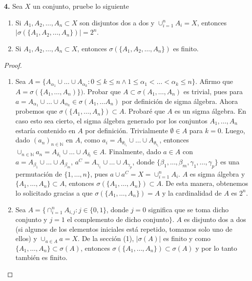 \documentclass{article}
\newenvironment{statement}[1]{\smallskip\noindent\color[rgb]{1.00,0.00,0.50} {\bf #1.}}{}
\theoremstyle{definition}
\theoremstyle{remark}
\newcommand{\BN}{\mathbb N}
\begin{document}
\begin{statement}{4}
  Sea $X$ un conjunto, pruebe lo siguiente
  \begin{enumerate}
    \item Si $A_1, A_2, \dots, A_n \subset X$ son disjuntos dos a dos y $\cup_{i = 1}^n A_i = X$, entonces $|\sigma(\{A_1, A_2, \dots, A_n\})| = 2^n$.
    \item Si $A_1, A_2, \dots, A_n \subset X$, entonces $\sigma(\{A_1, A_2, \dots, A_n\})$ es finito.
  \end{enumerate}
\end{statement}

\begin{proof}
  \begin{enumerate}
    \item Sea $A = \{A_{\alpha_1} \cup \dots \cup A_{\alpha_k} : 0 \leq k \leq n \land 1 \leq \alpha_1 < \dots < \alpha_k \leq n\}$. Afirmo que $A = \sigma(\{A_1, \dots, A_n)\})$.
      Probar que $A \subset \sigma(A_1, \dots, A_n)$ es trivial, pues para $a = A_{\alpha_1} \cup \dots \cup A_{\alpha_k} \in \sigma(A_1, \dots A_n)$ por definici\'on de sigma \'algebra.
      Ahora probemos que $\sigma(\{A_1, \dots, A_n\}) \subset A$.
      Probar\'e que $A$ es un sigma \'algebra. En caso esto sea cierto, el sigma \'algebra generado por los conjuntos $A_1, \dots, A_n$ estar\'ia contenido en $A$ por definici\'on.
      Trivialmente $\emptyset \in A$ para $k = 0$.
      Luego, dado $(a_n)_{n \in \BN}$ en $A$, como $a_i = A_{\theta_{i_1}} \cup \dots \cup A_{\theta_{i_{l_i}}}$, entonces $\cup_{n \in \BN} a_n = A_{\delta_1} \cup \dots \cup A_{\delta_l} \in A$.
      Finalmente, dado $a \in A$ con $a = A_{\beta_1} \cup \dots \cup A_{\beta_m}$, $a^C = A_{\gamma_1} \cup \dots \cup A_{\gamma_p}$, donde $\{\beta_1, \dots, \beta_m, \gamma_1, \dots, \gamma_p\}$ es una permutaci\'on de $\{1, \dots, n\}$, pues $a \cup a^C = X = \cup_{i = 1}^n A_i$.
      $A$ es sigma \'algebra y $\{A_1, \dots, A_n\} \subset A$, entonces $\sigma(\{A_1, \dots, A_n\}) \subset A$.
      De esta manera, obtenemos lo solicitado gracias a que $\sigma(\{A_1, \dots, A_n\}) = A$ y la cardinalidad de $A$ es $2^n$.
    \item Sea $A = \{\cap_{i = 1}^{n} A_{i, j} : j \in \{0, 1\}$, donde $j = 0$ significa que se toma dicho conjunto y $j = 1$ el complemento de dicho conjunto$\}$.
      $A$ es disjunto dos a dos (si algunos de los elementos iniciales est\'a repetido, tomamos solo uno de ellos) y $\cup_{a \in A} a = X$.
      De la secci\'on (1), $|\sigma(A)|$ es finito y como $\{A_1, \dots, A_n\} \subset \sigma(A)$, entonces $\sigma(\{A_1, \dots, A_n\}) \subset \sigma(A)$ y por lo tanto tambi\'en es finito.
  \end{enumerate}
\end{proof}
\end{document}
